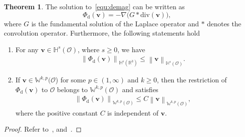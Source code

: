 \documentclass[11pt, reqno]{amsart}
\theoremstyle{definition}
\newtheorem{theorem}{Theorem}[section]
\numberwithin{equation}{section}
\newcommand{\bff}{\boldsymbol}
\newcommand{\bb}{\mathbb}
\newcommand{\norm}[2]{\left\|{#1}\right\|_{#2}}
\begin{document}
\begin{theorem}\label{the:Phi d}
The solution to~\eqref{equ:demag} can be written as
\begin{equation}\label{equ:Phi div G}
    \Phi_{\mathrm{d}}(\bff{v})= -\nabla\big(G\ast \text{div}(\bff{v})\big),
\end{equation}
where $G$ is the fundamental solution of the Laplace operator and $\ast$ denotes the convolution operator.
Furthermore, the following statements hold
\begin{enumerate}
    \item 
For any $\bff{v}\in \bb{H}^s(\mathscr{O})$, where $s\geq 0$, we have
\begin{align}\label{equ:Phi d O est}
	\norm{\Phi_{\mathrm{d}}(\bff{v})}{\bb{H}^s(\bb{R}^3)}
	\leq
	\norm{\bff{v}}{\bb{H}^s(\mathscr{O})}.
\end{align}

\item If $\bff{v}\in\bb{W}^{k,p}(\mathscr{O}$) for some $p\in (1,\infty)$ and $k\geq 0$, then the restriction of $\Phi_{\mathrm{d}}(\bff{v})$ to $\mathscr{O}$ belongs to $\bb{W}^{k,p}(\mathscr{O})$ and satisfies
\begin{align}\label{equ:Phi d Wkp}
	\norm{\Phi_{\mathrm{d}}(\bff{v})}{\bb{W}^{k,p}(\mathscr{O})}
	\leq
	C\norm{\bff{v}}{\bb{W}^{k,p}(\mathscr{O})},
\end{align}
where the positive constant $C$ is independent of $\bff{v}$.
\end{enumerate}
\end{theorem}

\begin{proof}
Refer to~\cite[Section~2.5]{San07}, \cite[Lemma~2.3]{CarFab01} and~\cite[Lemma~3.1]{DumLab12}.
\end{proof}



\end{document}
